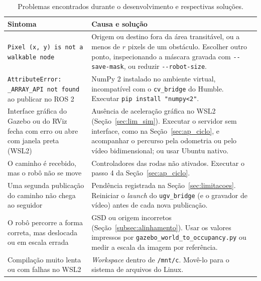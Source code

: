 \documentclass[
    12pt,
    openright,
    oneside,
    a4paper,
    english,
    brazil
]{abntex2}
\begin{document}
\begin{apendicesenv}
\begin{table}[H]
    \centering
    \caption{Problemas encontrados durante o desenvolvimento e respectivas soluções.}
    \label{tab:problemas}
    \footnotesize
    \renewcommand{\arraystretch}{1.25}
    \begin{tabular}{>{\raggedright\arraybackslash}p{5.6cm} >{\raggedright\arraybackslash}p{9.2cm}}
        \toprule
        \textbf{Sintoma} & \textbf{Causa e solução} \\
        \midrule
        \texttt{Pixel (x, y) is not a walkable node} & Origem ou destino fora da área transitável, ou a menos de $r$ pixels de um obstáculo. Escolher outro ponto, inspecionando a máscara gravada com \texttt{-{}-save-mask}, ou reduzir \texttt{-{}-robot-size}. \\
        \texttt{AttributeError: \_ARRAY\_API not found} ao publicar no ROS 2 & NumPy 2 instalado no ambiente virtual, incompatível com o \texttt{cv\_bridge} do Humble. Executar \texttt{pip install "numpy<2"}. \\
        Interface gráfica do Gazebo ou do RViz fecha com erro ou abre com janela preta (WSL2) & Ausência de aceleração gráfica no WSL2 (Seção~\ref{sec:lim_sim}). Executar o servidor sem interface, como na Seção~\ref{sec:ap_ciclo}, e acompanhar o percurso pela odometria ou pelo vídeo bidimensional; ou usar Ubuntu nativo. \\
        O caminho é recebido, mas o robô não se move & Controladores das rodas não ativados. Executar o passo 4 da Seção~\ref{sec:ap_ciclo}. \\
        Uma segunda publicação do caminho não chega ao seguidor & Pendência registrada na Seção~\ref{sec:limitacoes}. Reiniciar o \textit{launch} do \texttt{ugv\_bridge} (e o gravador de vídeo) antes de cada nova publicação. \\
        O robô percorre a forma correta, mas deslocada ou em escala errada & GSD ou origem incorretos (Seção~\ref{subsec:alinhamento}). Usar os valores impressos por \texttt{gazebo\_world\_to\_occupancy.py} ou medir a escala da imagem por referência. \\
        Compilação muito lenta ou com falhas no WSL2 & \textit{Workspace} dentro de \texttt{/mnt/c}. Movê-lo para o sistema de arquivos do Linux. \\
        \bottomrule
    \end{tabular}
\end{table}

\end{apendicesenv}
\end{document}

